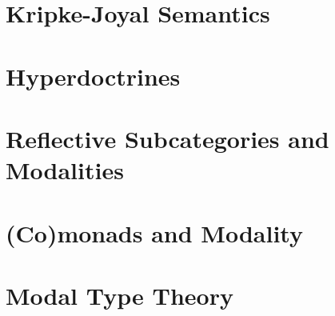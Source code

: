 \documentclass[11pt]{book}
\begin{document}
\section{Kripke-Joyal Semantics}

\section{Hyperdoctrines}

\section{Reflective Subcategories and Modalities}

\section{(Co)monads and Modality}

\section{Modal Type Theory}
\end{document}
